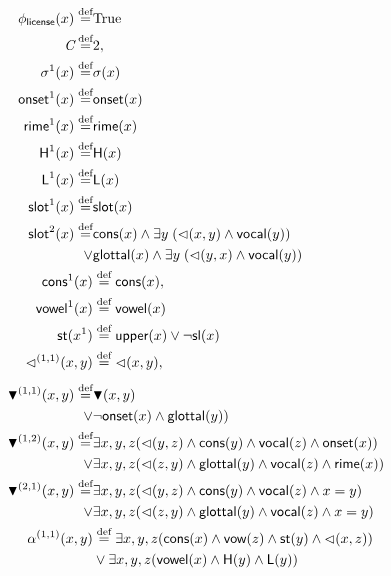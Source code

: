 \documentclass[11pt]{article}
\begin{document}
\begin{align*}
	\phi_{\textsf{license}}(x) \stackrel{\text{def}}{=}& \text{True}\\
	\textit{C} \stackrel{\text{def}}{=}& 2, \\
	\sigma^1(x) \stackrel{\text{def}}{=}& \sigma(x)\\
	\textsf{onset}^1 (x)\stackrel{\text{def}}{=}& \textsf{onset} (x) \\
	\textsf{rime}^1 (x) \stackrel{\text{def}}{=}& \textsf{rime} (x) \\
	\textsf{H}^1 (x) \stackrel{\text{def}}{=}& \textsf{H} (x) \\
	\textsf{L}^1 (x) \stackrel{\text{def}}{=}& \textsf{L} (x) \\
	\textsf{slot}^1 (x) \stackrel{\text{def}}{=}& \textsf{slot} (x)\\
	\textsf{slot}^2 (x) \stackrel{\text{def}}{=} & \textsf{cons}(x) \wedge\exists y\;(\lhd(x,y) \wedge \textsf{vocal}(y))\\
						\vee & \textsf{glottal}(x) \wedge\exists y\;(\lhd(y,x) \wedge \textsf{vocal}(y))\\
	\textsf{cons}^1 (x) & \stackrel{\text{def}}{=} \textsf{cons} (x), \\
	\textsf{vowel}^1 (x) & \stackrel{\text{def}}{=} \textsf{vowel} (x) \\
	\textsf{st}(x^1) & \stackrel{\text{def}}{=} \textsf{upper}(x) \vee \lnot \textsf{sl}(x) \\
	\lhd^{(1,1)}(x,y) &\stackrel{\text{def}}{=} \lhd(x,y), \\[4pt]
	\blacktriangledown^{(1,1)}(x,y) \stackrel{\text{def}}{=} & \blacktriangledown(x,y) \\
									\vee  & \lnot \textsf{onset}(x) \wedge \textsf{glottal}(y))\\
	\blacktriangledown^{(1,2)}(x,y) \stackrel{\text{def}}{=} & \exists x,y,z (\lhd(y,z) \wedge \textsf{cons}(y) \wedge \textsf{vocal}(z) \wedge \textsf{onset}(x))\\
	\vee &\exists x,y,z (\lhd(z,y) \wedge \textsf{glottal}(y) \wedge \textsf{vocal}(z) \wedge \textsf{rime}(x))\\
	\blacktriangledown^{(2,1)}(x,y) \stackrel{\text{def}}{=} & \exists x,y,z (\lhd(y,z) \wedge \textsf{cons}(y) \wedge \textsf{vocal}(z) \wedge x = y)\\
	\vee &\exists x,y,z (\lhd(z,y) \wedge \textsf{glottal}(y) \wedge \textsf{vocal}(z) \wedge x = y)\\
	\alpha^{(1,1)}(x,y) &\stackrel{\text{def}}{=}
	\exists x,y,z (
	\textsf{cons}(x)
	\wedge
	\textsf{vow}(z)
	\wedge
	\textsf{st}(y)
	\wedge
	\lhd(x,z)
	) \\
	&\vee
	\exists x,y,z (
	\textsf{vowel}(x)
	\wedge
	\textsf{H}(y)
	\wedge
	\textsf{L}(y)
	)
\end{align*}
\end{document}
